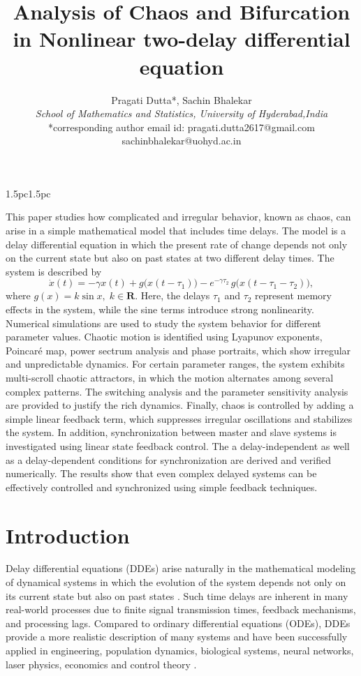 \documentclass[11pt]{article}
\title{\textbf{Analysis of Chaos and Bifurcation in Nonlinear two-delay differential equation}}
\author{  Pragati Dutta*, Sachin Bhalekar\\
	\textit{School of Mathematics and Statistics, University of Hyderabad,India}\\
	*corresponding author email id: pragati.dutta2617@gmail.com
	\\sachinbhalekar@uohyd.ac.in}
\date{}
\renewenvironment{abstract}{%
	\begin{center}%
		\normalfont\fontsize{10pt}{12pt}\selectfont
		\begin{adjustwidth}{1.5pc}{1.5pc} %
		}{%
		\end{adjustwidth}%
	\end{center}%
}
\theoremstyle{remark}
\begin{document}
	\maketitle

	\begin{abstract}
		This paper studies how complicated and irregular behavior, known as chaos, can arise in a simple mathematical model that includes time delays. The model is a delay differential equation in which the present rate of change depends not only on the current state but also on past states at two different delay times. The system is described by
		\begin{equation}
			\dot{x}(t)
			= -\gamma x(t)
			+ g\big(x(t - \tau_1)\big)
			- e^{-\gamma \tau_2}\, g\big(x(t - \tau_1 - \tau_2)\big),
		\end{equation}
		where  $g(x)=k \sin{x}, \; k\in\mathbf{R}$.
		Here, the delays $\tau_1$ and $\tau_2$ represent memory effects in the system, while the sine terms introduce strong nonlinearity. Numerical simulations are used to study the system behavior for different parameter values. Chaotic motion is identified using Lyapunov exponents, Poincar\'e map, power sectrum analysis and phase portraits, which show irregular and unpredictable dynamics. For certain parameter ranges, the system exhibits multi-scroll chaotic attractors, in which the motion alternates among several complex patterns. The switching analysis and the parameter sensitivity analysis are provided to justify the rich dynamics. Finally, chaos is controlled by adding a simple linear feedback term, which suppresses irregular oscillations and stabilizes the system. In addition, synchronization between master and slave systems is investigated using linear state feedback control. The a delay-independent as well as a delay-dependent conditions for synchronization are derived and verified numerically. The results show that even complex delayed systems can be effectively controlled and synchronized using simple feedback techniques.
	\end{abstract}
	


\section{Introduction}
\label{Intro}
Delay differential equations (DDEs) arise naturally in the mathematical modeling of dynamical systems in which the evolution of the system depends not only on its current state but also on past states \cite{hale1993introduction,diekmann2012delay,lakshmanan2011dynamics}. Such time delays are inherent in many real-world processes due to finite signal transmission times, feedback mechanisms, and processing lags. Compared to ordinary differential equations (ODEs), DDEs provide a more realistic description of many systems and have been successfully applied in engineering, population dynamics, biological systems, neural networks, laser physics, economics and control theory \cite{mackey1977oscillation,erneux2009applied,gopalsamy2013stability,lin2025hopf,krawiec2026lambert}.
\end{document}
